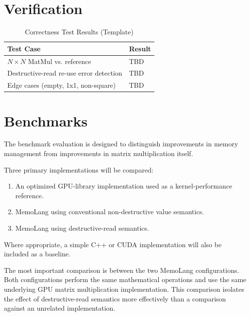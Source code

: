 \documentclass[a4paper]{article}
\begin{document}
	\section{Verification}
	
	
	\begin{table}[h]
		\centering
		\caption{Correctness Test Results (Template)}
		\label{tab:verification}
		\begin{tabular}{ll}
			\toprule
			Test Case & Result \\
			\midrule
			$N \times N$ MatMul vs. reference & TBD \\
			Destructive-read re-use error detection & TBD \\
			Edge cases (empty, 1x1, non-square) & TBD \\
			\bottomrule
		\end{tabular}
	\end{table}
	
	\section{Benchmarks}
	
	The benchmark evaluation is designed to distinguish improvements in memory management from improvements in matrix multiplication itself.
	
	Three primary implementations will be compared:
	
	\begin{enumerate}
		\item An optimized GPU-library implementation used as a kernel-performance reference.
		\item MemoLang using conventional non-destructive value semantics.
		\item MemoLang using destructive-read semantics.
	\end{enumerate}
	
	Where appropriate, a simple C++ or CUDA implementation will also be included as a baseline.
	
	The most important comparison is between the two MemoLang configurations. Both configurations perform the same mathematical operations and use the same underlying GPU matrix multiplication implementation. This comparison isolates the effect of destructive-read semantics more effectively than a comparison against an unrelated implementation.
	
\end{document}
